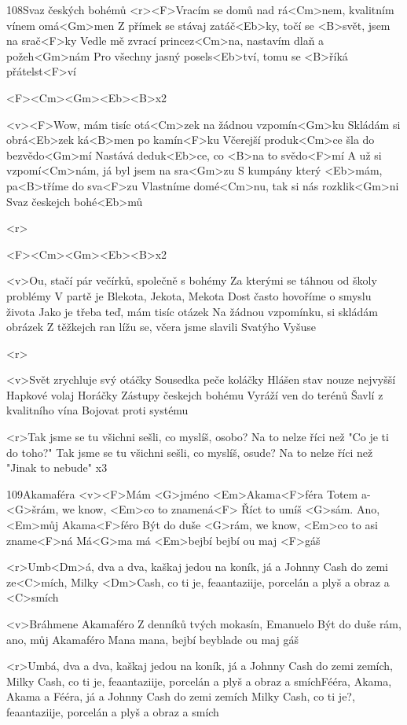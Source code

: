 \begin{song}[Wohnout]{108}{Svaz českých bohémů}{}
<r><F>Vracím se domů nad rá<Cm>nem, kvalitním vínem omá<Gm>men
Z přímek se stávaj zatáč<Eb>ky, točí se <B>svět, jsem na srač<F>ky
Vedle mě zvrací princez<Cm>na, nastavím dlaň a požeh<Gm>nám
Pro všechny jasný posels<Eb>tví, tomu se <B>říká přátelst<F>ví

<F><Cm><Gm><Eb><B>x2

<v><F>Wow, mám tisíc otá<Cm>zek na žádnou vzpomín<Gm>ku
Skládám si obrá<Eb>zek ká<B>men po kamín<F>ku
Včerejší produk<Cm>ce šla do bezvědo<Gm>mí
Nastává deduk<Eb>ce, co <B>na to svědo<F>mí
A už si vzpomí<Cm>nám, já byl jsem na sra<Gm>zu
S kumpány který <Eb>mám, pa<B>tříme do sva<F>zu
Vlastníme domé<Cm>nu, tak si nás rozklik<Gm>ni
Svaz českejch bohé<Eb>mů

<r>

<F><Cm><Gm><Eb><B>x2

<v>Ou, stačí pár večírků, společně s bohémy
Za kterými se táhnou od školy problémy
V partě je Blekota, Jekota, Mekota
Dost často hovoříme o smyslu života
Jako je třeba teď, mám tisíc otázek
Na žádnou vzpomínku, si skládám obrázek
Z těžkejch ran lížu se, včera jsme slavili
Svatýho Vyšuse

<r>

<v>Svět zrychluje svý otáčky
Sousedka peče koláčky
Hlášen stav nouze nejvyšší
Hapkové volaj Horáčky
Zástupy českejch bohému
Vyráží ven do terénů
Šavlí z kvalitního vína
Bojovat proti systému

<r>Tak jsme se tu všichni sešli, co myslíš, osobo?
Na to nelze říci než "Co je ti do toho?"
Tak jsme se tu všichni sešli, co myslíš, osude?
Na to nelze říci než "Jinak to nebude" x3
\end{song}
\begin{song}{109}{Akamaféra}{}
<v><F>Mám <G>jméno <Em>Akama<F>féra
Totem a-<G>šrám, we know, <Em>co to znamená<F>
Říct to umíš <G>sám. Ano, <Em>můj Akama<F>féro
Být do duše <G>rám, we know, <Em>co to asi zname<F>ná
Má<G>ma má <Em>bejbí bejbí ou maj <F>gáš

<r>Umb<Dm>á, dva a dva, kaškaj jedou na koník, 
já a Johnny Cash do zemi ze<C>mích,
Milky <Dm>Cash, co ti je, feaantaziije, 
porcelán a plyš a obraz a <C>smích

<v>Bráhmene Akamaféro
Z denníků tvých mokasín, Emanuelo
Být do duše rám, ano, můj Akamaféro
Mana mana, bejbí beyblade ou maj gáš

<r>Umbá, dva a dva, kaškaj jedou na koník, 
já a Johnny Cash do zemi zemích,
Milky Cash, co ti je, feaantaziije, porcelán a plyš a obraz a smíchFééra, Akama, Akama a Fééra,
já a Johnny Cash do zemi zemích
Milky Cash, co ti je?, feaantaziije, porcelán a plyš a obraz a smích
\end{song}

